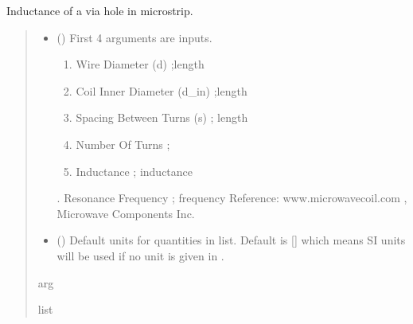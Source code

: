 \documentclass[letterpaper,10pt,english]{sphinxmanual}
\begin{document}

\begin{fulllineitems}
\label{\detokenize{components:components.L_air_core_coil}}
\pysigstartsignatures
{}
\pysigstopsignatures
\sphinxAtStartPar
Inductance of a via hole in microstrip.
\begin{quote}\begin{description}
\begin{itemize}
\item {}
\sphinxAtStartPar
{} () \textendash{}
\sphinxAtStartPar
First 4 arguments are inputs.
\begin{enumerate}
%
\item {}
\sphinxAtStartPar
Wire Diameter (d) ;length

\item {}
\sphinxAtStartPar
Coil Inner Diameter (d\_in) ;length

\item {}
\sphinxAtStartPar
Spacing Between Turns (s) ; length

\item {}
\sphinxAtStartPar
Number Of Turns ;

\item {}
\sphinxAtStartPar
Inductance ; inductance

\end{enumerate}

. Resonance Frequency ; frequency
Reference:  www.microwavecoil.com , Microwave Components Inc.


\item {}
\sphinxAtStartPar
{} (\sphinxstyleliteralemphasis{\sphinxupquote{, }}) \textendash{} Default units for quantities in  list. Default is {[}{]} which means SI units will be used if no unit is given in .

\end{itemize}

\sphinxAtStartPar
arg

\sphinxAtStartPar
list

\end{description}\end{quote}

\end{fulllineitems}
\end{document}
